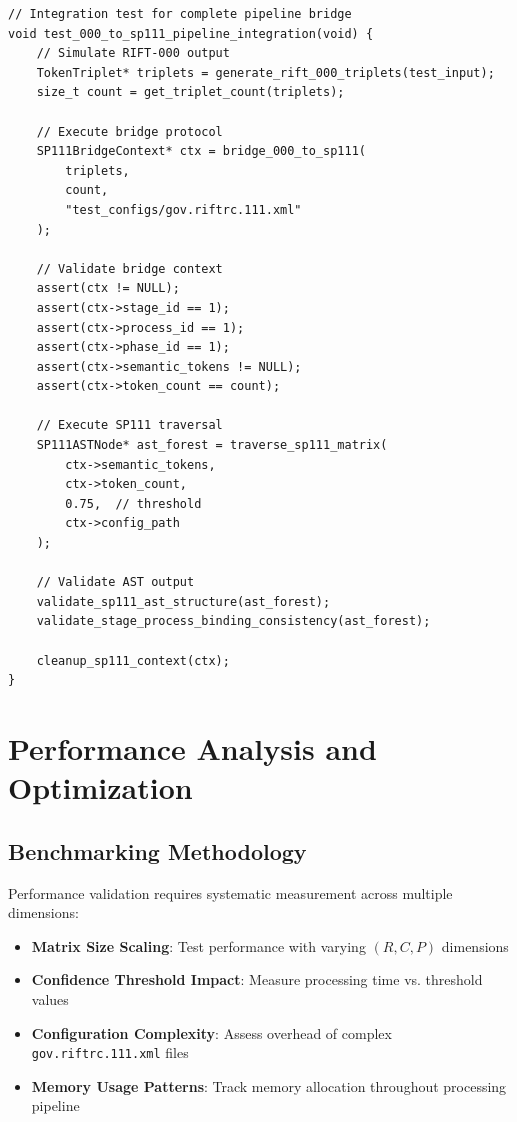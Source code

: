 \documentclass[11pt,a4paper]{article}
\theoremstyle{definition}
\theoremstyle{remark}
\begin{document}
\begin{lstlisting}[style=riftstyle, caption={RIFT-000 → SP111 Bridge Testing}, label=lst:bridge-tests]
// Integration test for complete pipeline bridge
void test_000_to_sp111_pipeline_integration(void) {
    // Simulate RIFT-000 output
    TokenTriplet* triplets = generate_rift_000_triplets(test_input);
    size_t count = get_triplet_count(triplets);
    
    // Execute bridge protocol
    SP111BridgeContext* ctx = bridge_000_to_sp111(
        triplets, 
        count,
        "test_configs/gov.riftrc.111.xml"
    );
    
    // Validate bridge context
    assert(ctx != NULL);
    assert(ctx->stage_id == 1);
    assert(ctx->process_id == 1);  
    assert(ctx->phase_id == 1);
    assert(ctx->semantic_tokens != NULL);
    assert(ctx->token_count == count);
    
    // Execute SP111 traversal
    SP111ASTNode* ast_forest = traverse_sp111_matrix(
        ctx->semantic_tokens,
        ctx->token_count,
        0.75,  // threshold
        ctx->config_path
    );
    
    // Validate AST output
    validate_sp111_ast_structure(ast_forest);
    validate_stage_process_binding_consistency(ast_forest);
    
    cleanup_sp111_context(ctx);
}
\end{lstlisting}


\section{Performance Analysis and Optimization}
\label{sec:performance}

\subsection{Benchmarking Methodology}
\label{subsec:benchmarking}

Performance validation requires systematic measurement across multiple dimensions:

\begin{itemize}
\item \textbf{Matrix Size Scaling}: Test performance with varying $(R, C, P)$ dimensions
\item \textbf{Confidence Threshold Impact}: Measure processing time vs. threshold values
\item \textbf{Configuration Complexity}: Assess overhead of complex \texttt{gov.riftrc.111.xml} files
\item \textbf{Memory Usage Patterns}: Track memory allocation throughout processing pipeline
\end{itemize}
\end{document}
